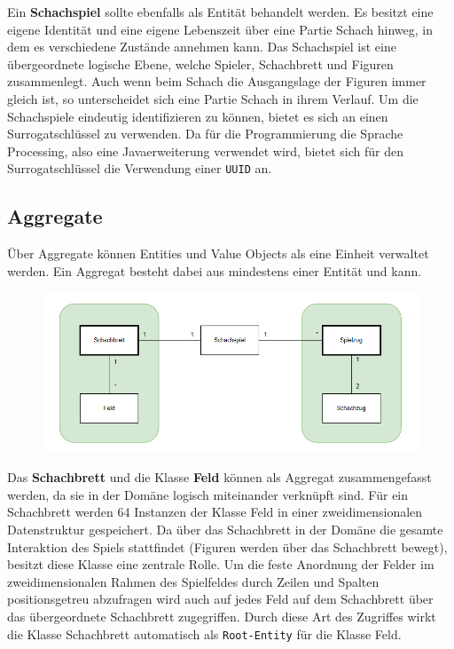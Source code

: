 Ein \textbf{Schachspiel} sollte ebenfalls als Entität behandelt werden. 
Es besitzt eine eigene Identität und eine eigene Lebenszeit über eine Partie Schach hinweg, in dem es verschiedene Zustände annehmen kann. 
Das Schachspiel ist eine übergeordnete logische Ebene, welche Spieler, Schachbrett und Figuren zusammenlegt. 
Auch wenn beim Schach die Ausgangslage der Figuren immer gleich ist, so unterscheidet sich eine Partie Schach in ihrem Verlauf. 
Um die Schachspiele eindeutig identifizieren zu können, bietet es sich an einen Surrogatschlüssel zu verwenden. 
Da für die Programmierung die Sprache Processing, also eine Javaerweiterung verwendet wird, bietet sich für den Surrogatschlüssel die Verwendung einer \texttt{UUID} an. 

\subsection*{Aggregate}

Über Aggregate können Entities und Value Objects als eine Einheit verwaltet werden. 
Ein Aggregat besteht dabei aus mindestens einer Entität und kann.

\begin{figure}[ht!]
    \centering
    \includegraphics*[scale=0.73]{Bilder/DDD_Aggregate.PNG}
\end{figure}

Das \textbf{Schachbrett} und die Klasse \textbf{Feld} können als Aggregat zusammengefasst werden, da sie in der Domäne logisch miteinander verknüpft sind. 
Für ein Schachbrett werden 64 Instanzen der Klasse Feld in einer zweidimensionalen Datenstruktur gespeichert. 
Da über das Schachbrett in der Domäne die gesamte Interaktion des Spiels stattfindet (Figuren werden über das Schachbrett bewegt), besitzt diese Klasse eine zentrale Rolle. 
Um die feste Anordnung der Felder im zweidimensionalen Rahmen des Spielfeldes durch Zeilen und Spalten positionsgetreu abzufragen wird auch auf jedes Feld auf dem Schachbrett über das übergeordnete Schachbrett zugegriffen.
Durch diese Art des Zugriffes wirkt die Klasse Schachbrett automatisch als \texttt{Root-Entity} für die Klasse Feld. 


